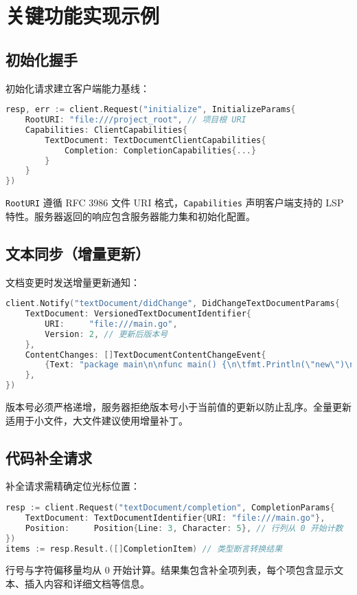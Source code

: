 \chapter{关键功能实现示例}
\section{初始化握手}
初始化请求建立客户端能力基线：\par
\begin{lstlisting}[language=go]
resp, err := client.Request("initialize", InitializeParams{
    RootURI: "file:///project_root", // 项目根 URI
    Capabilities: ClientCapabilities{
        TextDocument: TextDocumentClientCapabilities{
            Completion: CompletionCapabilities{...}
        }
    }
})
\end{lstlisting}
\texttt{RootURI} 遵循 RFC 3986 文件 URI 格式，\texttt{Capabilities} 声明客户端支持的 LSP 特性。服务器返回的响应包含服务器能力集和初始化配置。\par
\section{文本同步（增量更新）}
文档变更时发送增量更新通知：\par
\begin{lstlisting}[language=go]
client.Notify("textDocument/didChange", DidChangeTextDocumentParams{
    TextDocument: VersionedTextDocumentIdentifier{
        URI:     "file:///main.go",
        Version: 2, // 更新后版本号
    },
    ContentChanges: []TextDocumentContentChangeEvent{
        {Text: "package main\n\nfunc main() {\n\tfmt.Println(\"new\")\n}"},
    },
})
\end{lstlisting}
版本号必须严格递增，服务器拒绝版本号小于当前值的更新以防止乱序。全量更新适用于小文件，大文件建议使用增量补丁。\par
\section{代码补全请求}
补全请求需精确定位光标位置：\par
\begin{lstlisting}[language=go]
resp := client.Request("textDocument/completion", CompletionParams{
    TextDocument: TextDocumentIdentifier{URI: "file:///main.go"},
    Position:     Position{Line: 3, Character: 5}, // 行列从 0 开始计数
})
items := resp.Result.([]CompletionItem) // 类型断言转换结果
\end{lstlisting}
行号与字符偏移量均从 0 开始计算。结果集包含补全项列表，每个项包含显示文本、插入内容和详细文档等信息。\par
